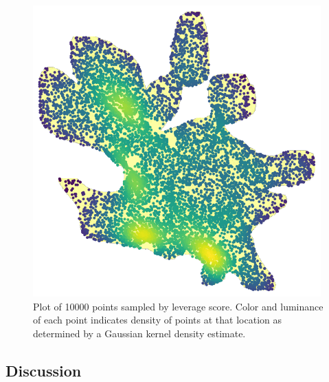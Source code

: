     \begin{figure} [h!btp]
    \begin{centering}
    \includegraphics[width=\linewidth]{images/cx_spatial.png}
    \end{centering}
    \caption{Plot of 10000 points sampled by leverage score. Color and
      luminance of each point indicates density of points at that location as
      determined by a Gaussian kernel density estimate.}
    \label{fig:cx_spatial}
    \end{figure} 


  \subsection{Discussion}
  \label{sect:lessons}
  
  

